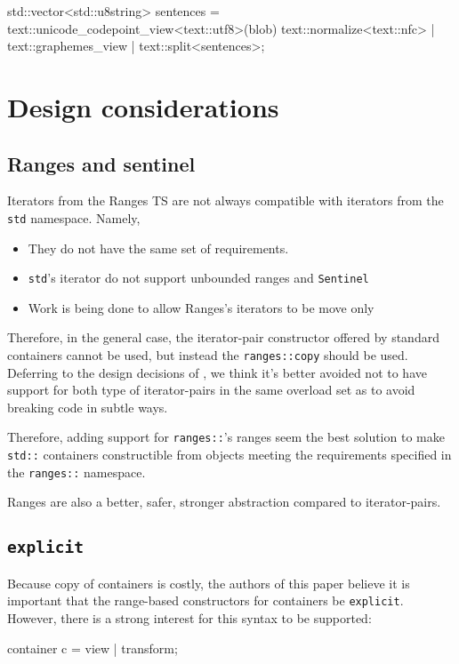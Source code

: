 \documentclass{wg21}
\newcommand{\cc}[1]{\texttt{#1}}
\begin{document}
\begin{codeblock}
    std::vector<std::u8string> sentences =
        text::unicode_codepoint_view<text::utf8>(blob)
        text::normalize<text::nfc> |
        text::graphemes_view |
        text::split<sentences>;
\end{codeblock}

\section{Design considerations}


\subsection{Ranges and sentinel}

Iterators from the Ranges TS are not always compatible with iterators from the \cc{std} namespace.
Namely,
\begin{itemize}
    \item They do not have the same set of requirements.
    \item \cc{std}'s iterator do not support unbounded ranges and \cc{Sentinel}
    \item Work is being done to allow Ranges's iterators to be move only
\end{itemize}

Therefore, in the general case, the iterator-pair constructor offered by standard containers cannot be used, but instead the \cc{ranges::copy} should be used.
Deferring to the design decisions of \cite{P0896R3}, we think it's better avoided not to have support for both type of iterator-pairs in the same overload set
as to avoid breaking code in subtle ways.

Therefore, adding support for \cc{ranges::}'s ranges seem the best solution to make \cc{std::} containers constructible from objects meeting the requirements
specified in the \cc{ranges::} namespace.

Ranges are also a better, safer, stronger abstraction compared to iterator-pairs.

\subsection{\cc{explicit}}

Because copy of containers is costly, the authors of this paper believe it is important that the range-based constructors for containers be \cc{explicit}.
However, there is a strong interest for this syntax to be supported:
\begin{codeblock}
    container c = view | transform;
\end{codeblock}
\end{document}
